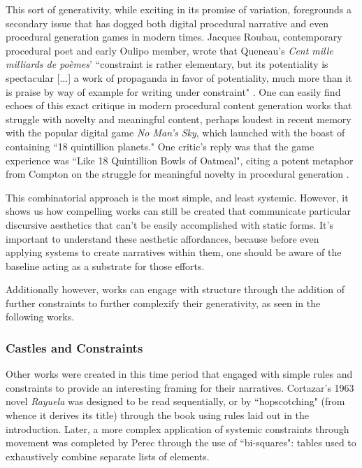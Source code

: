 This sort of generativity, while exciting in its promise of variation, foregrounds a secondary issue that has dogged both digital procedural narrative and even procedural generation games in modern times. Jacques Roubau, contemporary procedural poet and early Oulipo member, wrote that Queneau's \textit{Cent mille milliards de poèmes}' ``constraint is rather elementary, but its potentiality is spectacular [...] a work of propaganda in favor of potentiality, much more than it is praise by way of example for writing under constraint" \cite{Roubau}. One can easily find echoes of this exact critique in modern procedural content generation works that struggle with novelty and meaningful content, perhaps loudest in recent memory with the popular digital game \textit{No Man's Sky}, which launched with the boast of containing ``18 quintillion planets." One critic's reply was that the game experience was ``Like 18 Quintillion Bowls of Oatmeal", citing a potent metaphor from Compton on the struggle for meaningful novelty in procedural generation \cite{maiberg_2016}.

This combinatorial approach is the most simple, and least systemic. However, it shows us how compelling works can still be created that communicate particular discursive aesthetics that can't be easily accomplished with static forms. It's important to understand these aesthetic affordances, because before even applying systems to create narratives within them, one should be aware of the baseline acting as a substrate for those efforts.

Additionally however, works can engage with structure through the addition of further constraints to further complexify their generativity, as seen in the following works.

\subsubsection{Castles and Constraints}\label{subsubsec:castles-and-constraints}

Other works were created in this time period that engaged with simple rules and constraints to provide an interesting framing for their narratives. Cortazar's 1963 novel \textit{Rayuela} \cite{cortazar1996rayuela} was designed to be read sequentially, or by ``hopscotching" (from whence it derives its title) through the book using rules laid out in the introduction. Later, a more complex application of systemic constraints through movement was completed by Perec through the use of ``bi-squares": tables used to exhaustively combine separate lists of elements. 

